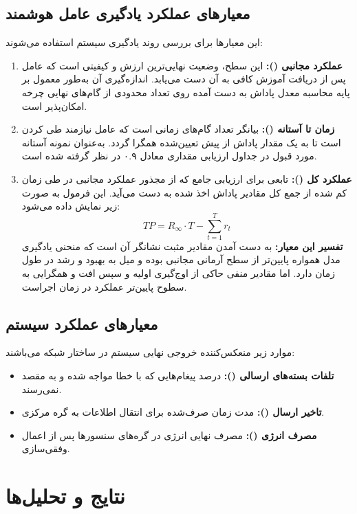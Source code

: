 \documentclass[oneside,openany,phd]{TMU-Thesis}
\begin{document}
\subsection{معیارهای عملکرد یادگیری عامل هوشمند}
این معیارها برای بررسی روند یادگیری سیستم استفاده می‌شوند:
\begin{enumerate}
    \item \textbf{عملکرد مجانبی ():} این سطح، وضعیت نهایی‌ترین ارزش و کیفیتی است که عامل پس از دریافت آموزش کافی به آن دست می‌یابد. اندازه‌گیری آن به‌طور معمول بر پایه محاسبه معدل پاداش به دست آمده روی تعداد محدودی از گام‌های نهایی چرخه امکان‌پذیر است.
    \item \textbf{زمان تا آستانه ():} بیانگر تعداد گام‌های زمانی است که عامل نیازمند طی کردن است تا به یک مقدار پاداش از پیش تعیین‌شده همگرا گردد. به‌عنوان نمونه آستانه مورد قبول در جداول ارزیابی مقداری معادل ۰.۹ در نظر گرفته شده است.
    \item \textbf{عملکرد کل ():} تابعی برای ارزیابی جامع که از مجذور عملکرد مجانبی در طی زمان کم شده از جمع کل مقادیر پاداش اخذ شده به دست می‌آید. این فرمول به صورت زیر نمایش داده می‌شود:
    $$TP = R_{\infty}\cdot T - \sum_{t=1}^{T} r_t$$
    \textbf{تفسیر این معیار:} به دست آمدن مقادیر مثبت نشانگر آن است که منحنی یادگیری مدل همواره پایین‌تر از سطح آرمانی مجانبی بوده و میل به بهبود و رشد در طول زمان دارد. اما مقادیر منفی حاکی از اوج‌گیری اولیه و سپس افت و همگرایی به سطوح پایین‌تر عملکرد در زمان اجراست.
\end{enumerate}

\subsection{معیارهای عملکرد سیستم}
موارد زیر منعکس‌کننده خروجی نهایی سیستم در ساختار شبکه می‌باشند:
\begin{itemize}
    \item \textbf{تلفات بسته‌های ارسالی ():} درصد پیغام‌هایی که با خطا مواجه شده و به مقصد نمی‌رسند.
    \item \textbf{تاخیر ارسال ():} مدت زمان صرف‌شده برای انتقال اطلاعات به گره مرکزی.
    \item \textbf{مصرف انرژی ():} مصرف نهایی انرژی در گره‌های سنسورها پس از اعمال وفقی‌سازی.
\end{itemize}

\section{نتایج و تحلیل‌ها}
\end{document}
